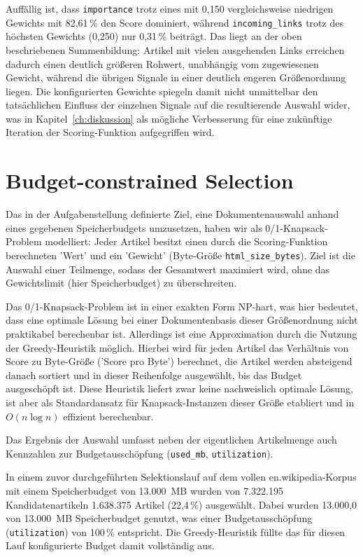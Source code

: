 Auffällig ist, dass \texttt{importance} trotz eines mit 0,150 vergleichsweise niedrigen Gewichts mit 82,61\,\%
den Score dominiert, während \texttt{incoming\_links} trotz des höchsten Gewichts (0,250) nur 0,31\,\%
beiträgt. Das liegt an der oben beschriebenen Summenbildung: Artikel mit vielen ausgehenden Links erreichen
dadurch einen deutlich größeren Rohwert, unabhängig vom zugewiesenen Gewicht, während die übrigen Signale in
einer deutlich engeren Größenordnung liegen. Die konfigurierten Gewichte spiegeln damit nicht unmittelbar den tatsächlichen Einfluss
der einzelnen Signale auf die resultierende Auswahl wider, was in
Kapitel~\ref{ch:diskussion} als mögliche Verbesserung für eine zukünftige Iteration der Scoring-Funktion
aufgegriffen wird.



\section{Budget-constrained Selection}
Das in der Aufgabenstellung definierte Ziel, eine Dokumentenauswahl anhand eines gegebenen Speicherbudgets
umzusetzen, haben wir als 0/1-Knapsack-Problem modelliert: Jeder Artikel besitzt einen durch die
Scoring-Funktion berechneten 'Wert' und ein 'Gewicht' (Byte-Größe \texttt{html\_size\_bytes}). Ziel ist die 
Auswahl einer Teilmenge, sodass der Gesamtwert maximiert wird, ohne das Gewichtslimit (hier Speicherbudget)
zu überschreiten.

Das 0/1-Knapsack-Problem ist in einer exakten Form NP-hart, was hier bedeutet, dass eine optimale Lösung bei einer Dokumentenbasis
dieser Größenordnung nicht praktikabel berechenbar ist. Allerdings ist eine Approximation durch die
Nutzung der Greedy-Heuristik möglich. Hierbei wird für jeden Artikel das Verhältnis von Score zu 
Byte-Größe ('Score pro Byte') berechnet, die Artikel werden absteigend danach sortiert und in dieser Reihenfolge
ausgewählt, bis das Budget ausgeschöpft ist. Diese Heuristik liefert zwar keine nachweislich optimale
Lösung, ist aber als Standardansatz für Knapsack-Instanzen dieser Größe etabliert und in $O(n \log n)$
effizient berechenbar.

Das Ergebnis der Auswahl umfasst neben der eigentlichen Artikelmenge auch Kennzahlen zur Budgetausschöpfung
(\texttt{used\_mb}, \texttt{utilization}). 

In einem zuvor durchgeführten Selektionslauf auf dem vollen
en.wikipedia-Korpus mit einem Speicherbudget von 13.000~MB wurden von 7.322.195 Kandidatenartikeln
1.638.375 Artikel (22,4\,\%) ausgewählt. Dabei wurden 13.000,0 von 13.000~MB Speicherbudget genutzt,
was einer Budgetausschöpfung (\texttt{utilization}) von 100\,\% entspricht. Die Greedy-Heuristik füllte
das für diesen Lauf konfigurierte Budget damit vollständig aus.
